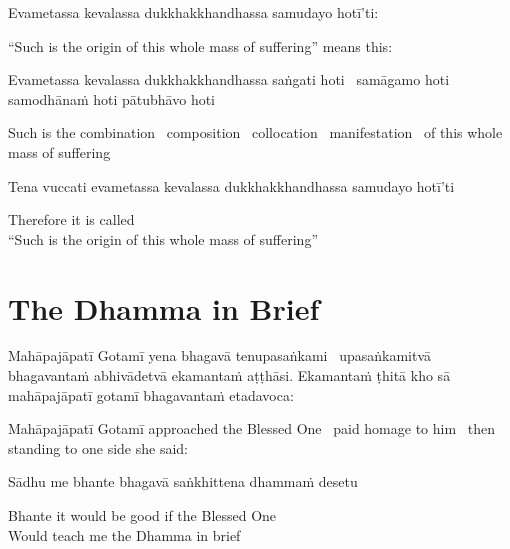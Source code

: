 Evametassa kevalassa dukkhakkhandhassa samudayo hotī’ti:

\begin{english}
  “Such is the origin of this whole mass of suffering” means this:
\end{english}

Evametassa kevalassa dukkhakkhandhassa saṅgati hoti \breathmark\ samāgamo hoti samodhānaṁ hoti pātubhāvo hoti

\begin{english}
  Such is the combination \breathmark\ composition \breathmark\ collocation \breathmark\ manifestation \breathmark\ of this whole mass of suffering
\end{english}

Tena vuccati evametassa kevalassa dukkhakkhandhassa samudayo hotī’ti

\begin{english}
  Therefore it is called\\
  “Such is the origin of this whole mass of suffering”
\end{english}



\section{The Dhamma in Brief}
\label{dhamma-in-brief}

\begin{leader}
\end{leader}

Mahāpajāpatī Gotamī yena bhagavā tenupasaṅkami \breathmark\ upasaṅkamitvā bhagavantaṁ abhivādetvā ekamantaṁ aṭṭhāsi. Ekamantaṁ ṭhitā kho sā mahāpajāpatī gotamī bhagavantaṁ etadavoca:

\begin{english}
  Mahāpajāpatī Gotamī approached the Blessed One \breathmark\ paid homage to him \breathmark\ then standing to one side she said:
\end{english}

Sādhu me bhante bhagavā saṅkhittena dhammaṁ desetu

\begin{english}
  Bhante it would be good if the Blessed One\\
  Would teach me the Dhamma in brief
\end{english}

